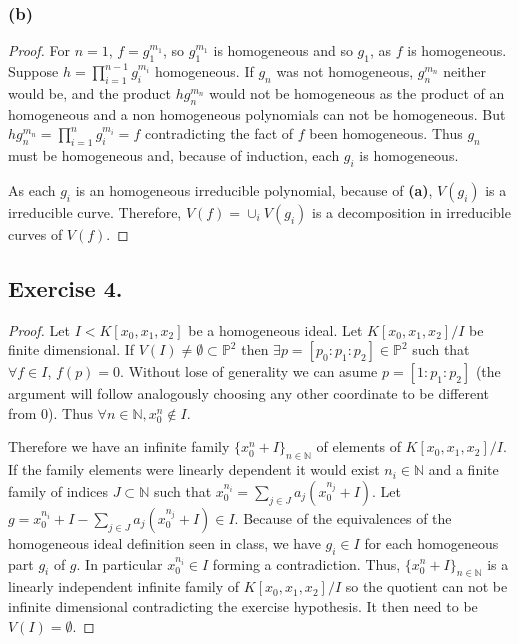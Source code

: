 \documentclass[11pt,a4paper]{article}
\begin{document}
\subsubsection*{(b)}
  \begin{proof}
    For $ n = 1 $, $ f = g_1^{m_1} $, so $ g_1^{m_1} $ is homogeneous and so $ g_1 $, as $ f $ is homogeneous. Suppose $ h = \prod_{i=1}^{n-1} g_i^{m_i} $ homogeneous. If $ g_n $ was not homogeneous, $ g_n^{m_n} $ neither would be, and the product $ h g_n^{m_n} $ would not be homogeneous as the product of an homogeneous and a non homogeneous polynomials can not be homogeneous. But $ h g_n^{m_n} = \prod_{i=1}^n g_i^{m_i} = f $ contradicting the fact of $ f $ been homogeneous. Thus $ g_n $ must be homogeneous and, because of induction, each $ g_i $ is homogeneous.

    \vspace{1mm}
    As each $ g_i $ is an homogeneous irreducible polynomial, because of {\bf (a)}, $ V(g_i) $ is a irreducible curve. Therefore, $ V(f) = \cup_i V(g_i) $ is a decomposition in irreducible curves of $ V(f) $.
  \end{proof}

\subsection*{Exercise 4.}
\begin{proof}
  Let $ I < K[x_0, x_1, x_2] $ be a homogeneous ideal. Let $ K[x_0, x_1, x_2] / I $ be finite dimensional. If $ V(I) \neq \emptyset \subset \mathbb P^2 $ then $ \exists p = [p_0: p_1: p_2] \in \mathbb P^2 $ such that $ \forall f \in I $, $ f(p) = 0 $. Without lose of generality we can asume $ p = [1: p_1: p_2] $ (the argument will follow analogously choosing any other coordinate to be different from $ 0 $). Thus $ \forall n \in \mathbb N, x_0^n \notin I $. 

  \vspace{1mm}
  Therefore we have an infinite family $ \{ x_0^n + I \}_{n \in \mathbb N} $ of elements of $ K[x_0, x_1, x_2] / I $. If the family elements were linearly dependent it would exist $ n_i \in \mathbb N $ and a finite family of indices $ J \subset \mathbb N $ such that $ x_0^{n_i} = \sum_{j \in J} a_j (x_0^{n_j} + I) $. Let $ g = x_0^{n_i} + I - \sum_{j \in J} a_j (x_0^{n_j} + I) \in I $. Because of the equivalences of the homogeneous ideal definition seen in class, we have $ g_i \in I $ for each homogeneous part $ g_i $ of $ g $. In particular $ x_0^{n_i} \in I $ forming a contradiction. Thus, $ \{ x_0^n + I \}_{n \in \mathbb N} $ is a linearly independent infinite family of $ K[x_0, x_1, x_2] / I $ so the quotient can not be infinite dimensional contradicting the exercise hypothesis. It then need to be $ V(I) = \emptyset $.
\end{proof}
\end{document}
